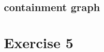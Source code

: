\documentclass[]{article}
\begin{document}
\subsection{containment graph}







\section{Exercise 5}

%
%
\end{document}
